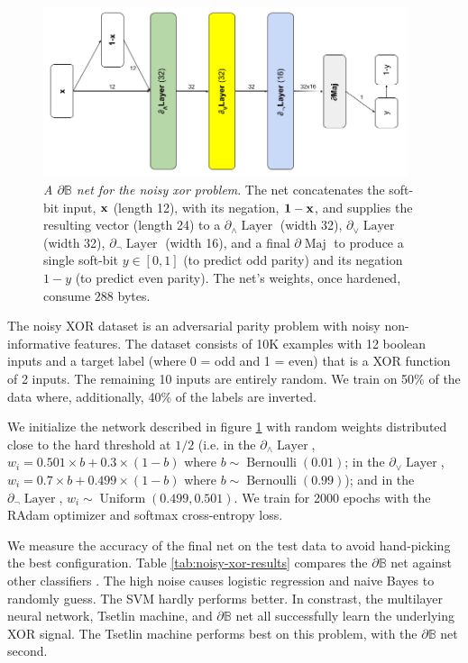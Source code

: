 \documentclass{article} %
\begin{document}
\begin{figure}[t!]
	\centering
	\includegraphics[width=0.95\textwidth]{noisy-xor-architecture.png}
	\caption{{\em A $\partial\mathbb{B}$ net for the noisy xor problem}. The net concatenates the soft-bit input, ${\bf x}$ (length 12), with its negation, ${\bf 1 - x}$, and supplies the resulting vector (length 24) to a $\partial_{\wedge}\!\!\operatorname{Layer}$ (width 32), $\partial_{\vee}\!\!\operatorname{Layer}$ (width 32),  $\partial_{\neg} \!\operatorname{Layer}$ (width 16), and a final $\partial\!\operatorname{Maj}$ to produce a single soft-bit $y \in [0,1]$ (to predict odd parity) and its negation $1-y$ (to predict even parity). The net's weights, once hardened, consume $288$ bytes.}
	\label{fig:noisy-xor-architecture}
\end{figure}

The noisy XOR dataset \citep{noisy-xor-dataset} is an adversarial parity problem with noisy non-informative features. The dataset consists of 10K examples with 12 boolean inputs and a target label (where 0 = odd and 1 = even) that is a XOR function of 2 inputs. The remaining 10 inputs are entirely random. We train on 50\% of the data where, additionally, 40\% of the labels are inverted.

We initialize the network described in figure \ref{fig:noisy-xor-architecture} with random weights distributed close to the hard threshold at $1/2$ (i.e. in the $\partial_{\wedge}\!\operatorname{Layer}$, $w_{i} = 0.501 \times b + 0.3 \times (1-b)$ where $b \sim \operatorname{Bernoulli}(0.01)$; in the $\partial_{\vee}\!\operatorname{Layer}$, $w_{i} = 0.7 \times b + 0.499 \times (1-b)$ where $b \sim \operatorname{Bernoulli}(0.99)$); and in the $\partial_{\neg}\!\operatorname{Layer}$, $w_{i} \sim \operatorname{Uniform}(0.499, 0.501)$. We train for 2000 epochs with the RAdam optimizer and softmax cross-entropy loss. 

We measure the accuracy of the final net on the test data to avoid hand-picking the best configuration. Table \ref{tab:noisy-xor-results} compares the $\partial\mathbb{B}$ net against other classifiers \citep{granmo18}. The high noise causes logistic regression and naive Bayes to randomly guess. The SVM hardly performs better. In constrast, the multilayer neural network, Tsetlin machine, and  $\partial\mathbb{B}$ net all successfully learn the underlying XOR signal. The Tsetlin machine performs best on this problem, with the $\partial\mathbb{B}$ net second.
\end{document}
